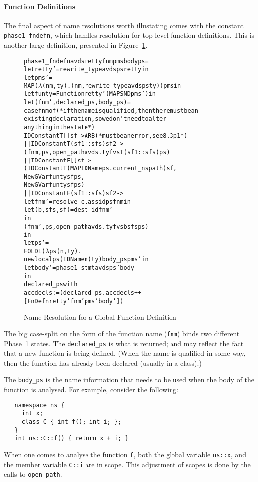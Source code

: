 \documentclass[11pt]{article}
\begin{document}
\paragraph{Function Definitions} The final aspect of name resolutions
worth illustating comes with the constant
\texttt{phase1_fndefn},
which handles resolution for top-level function definitions.  This is
another large definition, presented in Figure~\ref{fig:phase1-fndefn}.
\begin{figure}[htbp]
\begin{alltt}
   phase1_fndefn avds retty fnm pms body ps =
     let retty' = rewrite_type avds ps retty in
     let pms' =
       MAP (\(\lambda\)(nm,ty). (nm, rewrite_type avds ps ty)) pms in
     let funty = Function retty' (MAP SND pms') in
     let (fnm',declared_ps, body_ps) =
       case fnm of (* if the name is qualified, then there must be an
                      existing declaration, so we don't need to alter
                      anything in the state *)
          IDConstant T [] sf -> ARB (* must be an error, see 8.3 p1 *)
       || IDConstant T (sf1::sfs) sf2 ->
             (fnm, ps, open_path avds.tyfvs T (sf1::sfs) ps)
       || IDConstant F [] sf ->
             (IDConstant T (MAP IDName ps.current_nspath) sf,
              NewGVar funty sf ps,
              NewGVar funty sf ps)
       || IDConstant F (sf1::sfs) sf2 ->
             let fnm' = resolve_classid ps fnm in
             let (b,sfs,sf) = dest_id fnm'
             in
               (fnm', ps, open_path avds.tyfvs b sfs ps)
     in
     let ps' =
       FOLDL (\(\lambda\)ps (n,ty).
                  newlocal ps (IDName n) ty) body_ps pms' in
     let body' = phase1_stmt avds ps' body
     in
       declared_ps with
         accdecls := (declared_ps.accdecls ++
                      [FnDefn retty' fnm' pms' body'])
\end{alltt}
\caption{Name Resolution for a Global Function Definition}
\label{fig:phase1-fndefn}
\end{figure}
The big case-split on the form of the function name (\texttt{fnm})
binds two different Phase~1 states.  The \texttt{declared_ps} is what
is returned; and may reflect the fact that a new function is being
defined.  (When the name is qualified in some way, then the function
has already been declared (usually in a class).)

The \texttt{body_ps} is the name information that needs to be used
when the body of the function is analysed.  For example, consider the
following:
\begin{verbatim}
   namespace ns {
     int x;
     class C { int f(); int i; };
   }
   int ns::C::f() { return x + i; }
\end{verbatim}
When one comes to analyse the function \texttt{f}, both the global
variable \texttt{ns::x}, and the member variable \texttt{C::i} are in
scope.  This adjustment of scopes is done by the calls to
\texttt{open_path}.
\end{document}
